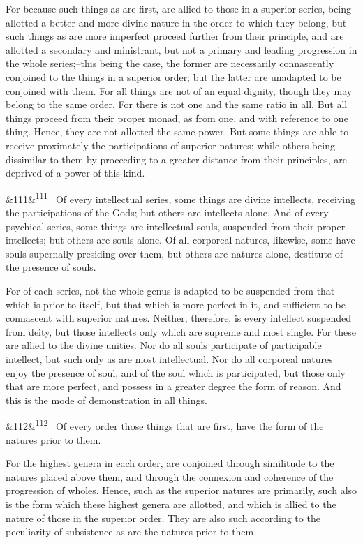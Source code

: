 \documentclass[12pt]{article}
\newcommand{\para}[1][]{\par\noindent\ifx&#1&\else\textsuperscript{\footnotesize #1}~\fi}
\begin{document}
For because such things as are first, are allied to those in a superior series, being allotted a better and more divine nature in the order to which they belong, but such things as are more imperfect proceed further from their principle, and are allotted a secondary and ministrant, but not a primary and leading progression in the whole series;--this being the case, the former are necessarily connascently conjoined to the things in a superior order; but the latter are unadapted to be conjoined with them. For all things are not of an equal dignity, though they may belong to the same order. For there is not one and the same ratio in all. But all things proceed from their proper monad, as from one, and with reference to one thing. Hence, they are not allotted the same power. But some things are able to receive proximately the participations of superior natures; while others being dissimilar to them by proceeding to a greater distance from their principles, are deprived of a power of this kind.

\para[111] Of every intellectual series, some things are divine intellects, receiving the participations of the Gods; but others are intellects alone. And of every psychical series, some things are intellectual souls, suspended from their proper intellects; but others are souls alone. Of all corporeal natures, likewise, some have souls supernally presiding over them, but others are natures alone, destitute of the presence of souls.

For of each series, not the whole genus is adapted to be suspended from that which is prior to itself, but that which is more perfect in it, and sufficient to be connascent with superior natures. Neither, therefore, is every intellect suspended from deity, but those intellects only which are supreme and most single. For these are allied to the divine unities. Nor do all souls participate of participable intellect, but such only as are most intellectual. Nor do all corporeal natures enjoy the presence of soul, and of the soul which is participated, but those only that are more perfect, and possess in a greater degree the form of reason. And this is the mode of demonstration in all things.

\para[112] Of every order those things that are first, have the form of the natures prior to them.

For the highest genera in each order, are conjoined through similitude to the natures placed above them, and through the connexion and coherence of the progression of wholes. Hence, such as the superior natures are primarily, such also is the form which these highest genera are allotted, and which is allied to the nature of those in the superior order. They are also such according to the peculiarity of subsistence as are the natures prior to them.
\end{document}
